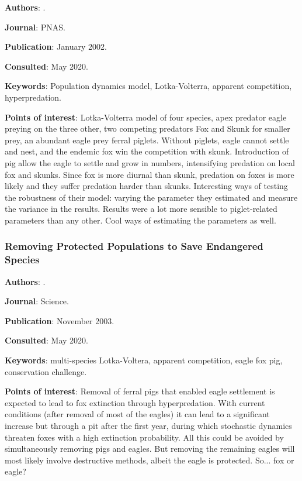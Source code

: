 \documentclass[12pt,a4paper]{article}
\begin{document}
\textbf{Authors}: \cite{roemer2002eagle}.

\textbf{Journal}: PNAS.

\textbf{Publication}: January 2002.

\textbf{Consulted}: May 2020.

\textbf{Keywords}: Population dynamics model, Lotka-Volterra, apparent competition, hyperpredation.

\textbf{Points of interest}: Lotka-Volterra model of four species, apex predator eagle preying on the three other, two competing predators Fox and Skunk for smaller prey, an abundant eagle prey ferral piglets. Without piglets, eagle cannot settle and nest, and the endemic fox win the competition with skunk. Introduction of pig allow the eagle to settle and grow in numbers, intensifying predation on local fox and skunks. Since fox is more diurnal than skunk, predation on foxes is more likely and they suffer predation harder than skunks.
Interesting ways of testing the robustness of their model: varying the parameter they estimated and measure the variance in the results. Results were a lot more sensible to piglet-related parameters than any other. Cool ways of estimating the parameters as well.

\newpage

\subsubsection*{Removing Protected Populations to Save Endangered Species}

\textbf{Authors}: \cite{courchamp2003removing}.

\textbf{Journal}: Science.

\textbf{Publication}: November 2003.

\textbf{Consulted}: May 2020.

\textbf{Keywords}: multi-species Lotka-Voltera, apparent competition, eagle fox pig, conservation challenge.

\textbf{Points of interest}: Removal of ferral pigs that enabled eagle settlement is expected to lead to fox extinction through hyperpredation. With current conditions (after removal of most of the eagles) it can lead to a significant increase but through a pit after the first year, during which stochastic dynamics threaten foxes with a high extinction probability. All this could be avoided by simultaneously removing pigs and eagles. But removing the remaining eagles will most likely involve destructive methods, albeit the eagle is protected. So... fox or eagle?
\end{document}
